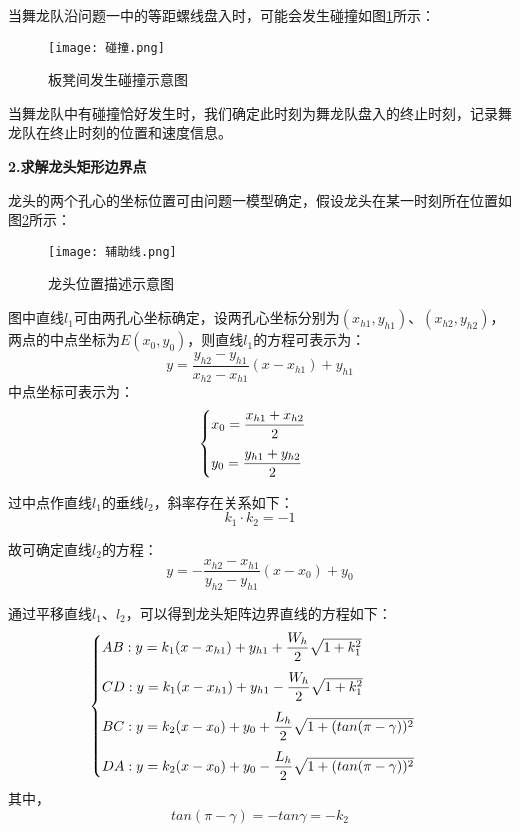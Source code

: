 \documentclass[withoutpreface,bwprint]{cumcmthesis} %
\begin{document}
	当舞龙队沿问题一中的等距螺线盘入时，可能会发生碰撞如图\ref{碰撞}所示：
	\begin{figure}[H]
		\centering
		\texttt{[image: 碰撞.png]}
		\caption{板凳间发生碰撞示意图}
		\label{碰撞} %
	\end{figure}
	当舞龙队中有碰撞恰好发生时，我们确定此时刻为舞龙队盘入的终止时刻，记录舞龙队在终止时刻的位置和速度信息。
	
	\textbf{2.求解龙头矩形边界点}
	
	龙头的两个孔心的坐标位置可由问题一模型确定，假设龙头在某一时刻所在位置如图\ref{辅助线}所示：
	\begin{figure}[H]
		\centering
		\texttt{[image: 辅助线.png]}
		\caption{龙头位置描述示意图}
		\label{辅助线} %
	\end{figure}
	图中直线$l_1$可由两孔心坐标确定，设两孔心坐标分别为$(x_{h1},y_{h1})$、$(x_{h2},y_{h2})$，两点的中点坐标为$E(x_0,y_0)$，则直线$l_1$的方程可表示为：
	\begin{equation}
		y=\dfrac{y_{h2}-y_{h1}}{x_{h2}-x_{h1}}(x-x_{h1})+y_{h1}
	\end{equation}
	中点坐标可表示为：
	\begin{equation}
		\begin{cases}
			\vspace{\topsep}
			x_0=\dfrac{x_{h1}+x_{h2}}{2}\\
			y_0=\dfrac{y_{h1}+y_{h2}}{2}
		\end{cases}
	\end{equation}
	
	过中点作直线$l_1$的垂线$l_2$，斜率存在关系如下：
	\begin{equation}
		k_1\cdot k_2=-1
	\end{equation}
	
	故可确定直线$l_2$的方程：
	\begin{equation}
		y=-\dfrac{x_{h2}-x_{h1}}{y_{h2}-y_{h1}}(x-x_0)+y_0
	\end{equation}
	
	通过平移直线$l_1$、$l_2$，可以得到龙头矩阵边界直线的方程如下：
	\begin{equation}
		\begin{cases}
			\vspace{\topsep}
			AB:y=k_1(x-x_{h1})+y_{h1}+\dfrac{W_h}{2}\sqrt{1+k_1^2}\\
			\vspace{\topsep}
			CD:y=k_1(x-x_{h1})+y_{h1}-\dfrac{W_h}{2}\sqrt{1+k_1^2}\\
			\vspace{\topsep}
			BC:y=k_2(x-x_0)+y_0+\dfrac{L_h}{2}\sqrt{1+(tan(\pi-\gamma))^2}\\
			DA:y=k_2(x-x_0)+y_0-\dfrac{L_h}{2}\sqrt{1+(tan(\pi-\gamma))^2}\\
		\end{cases}
	\end{equation}
	其中，
	\begin{equation}
		tan(\pi-\gamma)=-tan\gamma=-k_2
	\end{equation}
	
\end{document}
